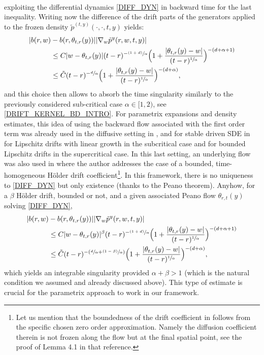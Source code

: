 \documentclass[JEP,XML,SOM,Unicode,published]{cedram}
\newcommand{\psfrac}[2]{\sfrac{(#1)}{#2}}
\theoremstyle{plain}
\theoremstyle{definition}
\newcommand\1{{\mathbf{1}}}
\begin{document}
{\begin{align*}
\end{align*}
exploiting the differential dynamics \eqref{DIFF_DYN} in backward time for the last inequality.
Writing now the difference of the drift parts of the generators applied to the frozen density $\tilde p^{(t,y)}(\cdot,\cdot,t,y)$ yields:
\begin{align*}
|b(r,w)&-b(r,\theta_{t,r}(y))||\nabla_w \tilde p^y(r,w,t,y)|\\
&\le  C |w-\theta_{t,r}(y)|(t-r)^{-\psfrac{1+d}\alpha}\Bigl(1+\frac{|\theta_{t,r}(y)-w|}{(t-r)^{\sfrac 1\alpha}}\Bigr)^{-(d+\alpha+1)}\\
&\le  \tilde C (t-r)^{-\sfrac{d}\alpha}\Bigl(1+\frac{|\theta_{t,r}(y)-w|}{(t-r)^{\sfrac 1\alpha}}\Bigr)^{-(d+\alpha)},
\end{align*}
and this choice then allows to absorb the time singularity similarly to the previously considered sub-critical case $\alpha\in [1,2) $, see \eqref{DRIFT_KERNEL_BD_INTRO}. For parametrix expansions and density estimates, this idea of using the backward flow associated with the first order term was already used in the diffusive setting in \cite{kona:meno:molc:10}, \cite{dela:meno:10} and for stable driven SDE in~\cite{huan:15} for Lipschitz drifts with linear growth in the subcritical case and \cite{knop:kuli:18} for bounded Lipschitz drifts in the supercritical case. In this last setting, an underlying flow was also used in \cite{kuli:19} where the author addresses the case of a bounded, time-homogeneous Hölder drift coefficient\footnote{Let us mention that the boundedness of the drift coefficient in \cite{kuli:19} follows from the specific chosen zero order approximation. Namely the diffusion coefficient therein is not frozen along the flow but at the final spatial point, see \eg the proof of Lemma 4.1 in that reference.}. In this framework, there is no uniqueness to \eqref{DIFF_DYN} but only existence (thanks to the Peano theorem). Anyhow, for a $\beta$ Hölder drift, bounded or not, and a given associated Peano flow $\theta_{r,t}(y) $ solving \eqref{DIFF_DYN},
\begin{equation}\label{DRIFT_KERNEL_BD_INTRO_BD_FLOW}
\begin{aligned}
|b(r,w)&-b(r,\theta_{t,r}(y))||\nabla_w \tilde p^y(r,w,t,y)|\\
&\le  C |w-\theta_{t,r}(y)|^\beta(t-r)^{-\psfrac{1+d}\alpha}\Bigl(1+\frac{|\theta_{t,r}(y)-w|}{(t-r)^{\sfrac 1\alpha}}\Bigr)^{-(d+\alpha+1)}\\
&\le  \tilde C (t-r)^{-(\sfrac{d}\alpha+\psfrac{1-\beta}{\alpha} )}\Bigl(1+\frac{|\theta_{t,r}(y)-w|}{(t-r)^{\sfrac 1\alpha}}\Bigr)^{-(d+\alpha)},
\end{aligned}
\end{equation}
which yields an integrable singularity provided $\alpha+\beta>1 $ (which is the natural condition we assumed and already discussed above). This type of estimate is crucial for the parametrix approach to work in our framework.}
\end{document}
